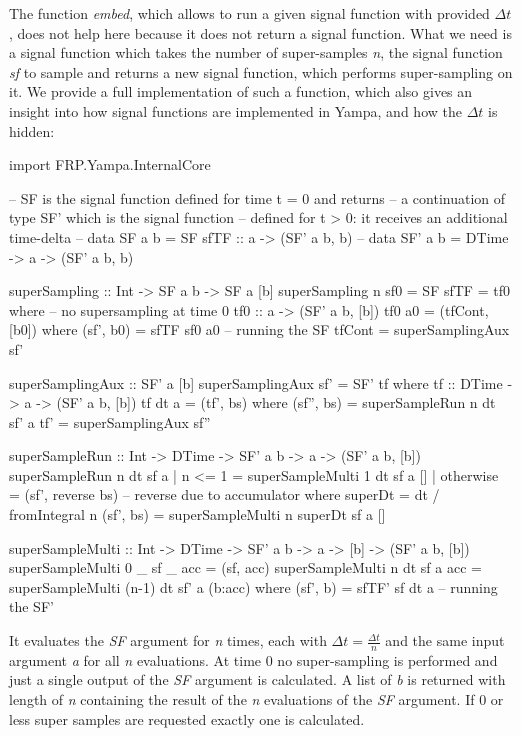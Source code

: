 The function \textit{embed}, which allows to run a given signal function with provided $\Delta t$, does not help here because it does not return a signal function. What we need is a signal function which takes the number of super-samples \textit{n}, the signal function \textit{sf} to sample and returns a new signal function, which performs super-sampling on it. We provide a full implementation of such a function, which also gives an insight into how signal functions are implemented in Yampa, and how the $\Delta t$ is hidden:

\begin{HaskellCode}
import FRP.Yampa.InternalCore

-- SF is the signal function defined for time t = 0 and returns
-- a continuation of type SF' which is the signal function 
-- defined for t > 0: it receives an additional time-delta
-- data SF a b  = SF { sfTF :: a -> (SF' a b, b) }
-- data SF' a b = DTime -> a -> (SF' a b, b)

superSampling :: Int -> SF a b -> SF a [b]
superSampling n sf0 = SF { sfTF = tf0 }
  where
    -- no supersampling at time 0
    tf0 :: a -> (SF' a b, [b])
    tf0 a0 = (tfCont, [b0])
      where
        (sf', b0) = sfTF sf0 a0 -- running the SF
        tfCont    = superSamplingAux sf'

    superSamplingAux :: SF' a [b]
    superSamplingAux sf' = SF' tf
      where
        tf :: DTime -> a -> (SF' a b, [b])
        tf dt a = (tf', bs)
          where
            (sf'', bs) = superSampleRun n dt sf' a
            tf'        = superSamplingAux sf''

    superSampleRun :: Int -> DTime -> SF' a b -> a -> (SF' a b, [b])
    superSampleRun n dt sf a 
        | n <= 1    = superSampleMulti 1 dt sf a []
        | otherwise = (sf', reverse bs)  -- reverse due to accumulator
      where
        superDt   = dt / fromIntegral n
        (sf', bs) = superSampleMulti n superDt sf a []

    superSampleMulti :: Int -> DTime -> SF' a b -> a -> [b] -> (SF' a b, [b])
    superSampleMulti 0 _ sf _ acc  = (sf, acc)
    superSampleMulti n dt sf a acc = superSampleMulti (n-1) dt sf' a (b:acc) 
      where
        (sf', b) = sfTF' sf dt a -- running the SF'
\end{HaskellCode}

It evaluates the \textit{SF} argument for \textit{n} times, each with $\Delta t = \frac{\Delta t}{n}$ and the same input argument \textit{a} for all \textit{n} evaluations. At time 0 no super-sampling is performed and just a single output of the \textit{SF} argument is calculated. A list of \textit{b} is returned with length of \textit{n} containing the result of the \textit{n} evaluations of the \textit{SF} argument. If 0 or less super samples are requested exactly one is calculated. %

